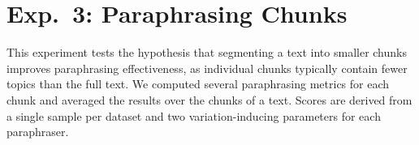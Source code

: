 \section{Exp.\ 3: Paraphrasing Chunks}
\label{sec:results_chunks}

This experiment tests the hypothesis that segmenting a text into smaller chunks improves paraphrasing effectiveness, as individual chunks typically contain fewer topics than the full text. 
We computed several paraphrasing metrics for each chunk and averaged the results over the chunks of a text.
Scores are derived from a single sample per dataset and two variation-inducing parameters for each paraphraser.

\begin{table}[h]
\centering
\caption[Impact of the number of chunks on paraphrase measures]{Impact of the number of chunks on syntactic and semantic paraphrase measures. 
Impact is reported as the absolute change between a single-chunk paraphrase and the maximum number of chunks (i.e.\ 5). 
Bold values indicate the largest observed changes. 
Ideally, syntactic measures should be minimised, while semantic measures are maximised.}
\label{tab:impact_chunks_dataset_paraphraser}
\end{table}

